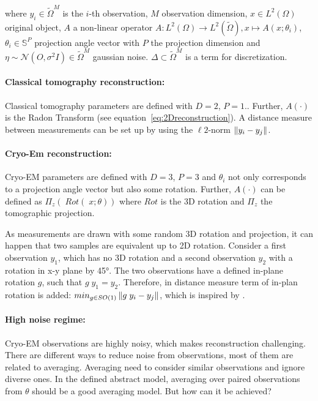 where $y_i \in \tilde{\Omega}^M$ is the $i$-th observation, $M$ observation dimension,
$x \in L^2(\Omega)$ original object, $A$ a non-linear operator 
$A: L^2(\Omega) \to L^2(\tilde{\Omega}), x \mapsto A(x; \theta_i)$, 
$\theta_i \in \mathbb{S}^P$ projection angle vector with $P$ the projection dimension
and
$\eta \sim \mathcal{N}(O, \sigma^2 I) \in \tilde{\Omega}^M$ gaussian noise. 
$\Delta \subset \tilde{\Omega}^{M}$ is a term for discretization.

\paragraph{Classical tomography reconstruction:}

Classical tomography parameters are defined with $D=2$, $P=1$..
Further, $A(\cdot)$ is the Radon Transform (see equation~\ref{eq:2Dreconstruction}).
A distance measure between measurements can be set up by using the $\ell2$-norm $\left\lVert y_i - y_j\right\rVert$.

\paragraph{Cryo-Em reconstruction:}
Cryo-EM parameters are defined with $D=3$, $P=3$ and $\theta_i$ not only corresponds to
a projection angle vector but also some rotation.
Further, $A(\cdot)$ can be defined as $\Pi_z \left(\; Rot(\;x; \theta) \right)$ 
where $Rot$ is the 3D rotation and $\Pi_z$ the tomographic projection.

As measurements are drawn with some random 3D rotation and projection, 
it can happen that two samples are equivalent up to 2D rotation. 
Consider a first observation $y_1$, which has no 3D rotation and 
a second observation $y_2$ with a rotation in x-y plane by 45°.
The two observations have a defined in-plane rotation $g$, such that $g \; y_1 = y_2$.
Therefore, in distance measure term of in-plan rotation is added: $min_{g \in SO(1)}\left\lVert g \;y_i - y_j\right\rVert$, 
which is inspired by \cite{multiDiffusionMaps}. 


\paragraph{High noise regime:}
Cryo-EM observations are highly noisy, which makes reconstruction challenging. 
There are different ways to reduce noise from observations, most of them are related to averaging. 
Averaging need to consider similar observations and ignore diverse ones. 
In the defined abstract model, averaging over paired observations from $\theta$ should be a good averaging model.
But how can it be achieved? 

